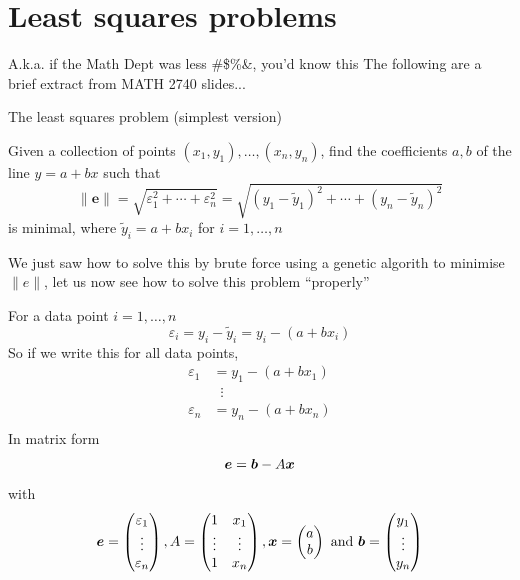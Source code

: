 \documentclass[aspectratio=169]{beamer}
\begin{document}


\section{Least squares problems}

\begin{frame}{A.k.a. if the Math Dept was less \#\$\%\&, you'd know this}
	The following are a brief extract from MATH 2740 slides...
\end{frame}


\begin{frame}{The least squares problem (simplest version)}
	\begin{definition}
		Given a collection of points $(x_1,y_1),\ldots,(x_n,y_n)$, find the coefficients $a,b$ of the line $y=a+bx$ such that
		$$
		\|\mathbf{e}\|=\sqrt{\varepsilon_1^2+\cdots+\varepsilon_n^2}
		=\sqrt{(y_1-\tilde y_1)^2+\cdots+(y_n-\tilde y_n)^2}
		$$
		is minimal, where $\tilde y_i=a+bx_i$ for $i=1,\ldots,n$
	\end{definition}
	\vfill
	We just saw how to solve this by brute force using a genetic algorith to minimise $\|e\|$, let us now see how to solve this problem ``properly''
\end{frame}


\begin{frame}
	For a data point $i=1,\ldots,n$
	\[
	\varepsilon_i = y_i-\tilde y_i = y_i - (a+bx_i)
	\]
	So if we write this for all data points,
	\begin{align*}
	\varepsilon_1 &= y_1 - (a+bx_1) \\
	&\;\;\vdots \\
	\varepsilon_n &= y_n - (a+bx_n) \\
	\end{align*}
	In matrix form
	\[
	\bm{e} = \bm{b}-A\bm{x}
	\]
	with
	\[
	\bm{e} = \begin{pmatrix}
	\varepsilon_1\\ \vdots\\ \varepsilon_n
	\end{pmatrix},
	A=\begin{pmatrix}
	1 & x_1 \\ \vdots & \vdots \\ 1 & x_n
	\end{pmatrix},
	\bm{x} = \begin{pmatrix}
	a\\b
	\end{pmatrix}\textrm{ and }
	\bm{b} = \begin{pmatrix}
	y_1\\ \vdots\\ y_n
	\end{pmatrix}
	\]
\end{frame}
\end{document}
